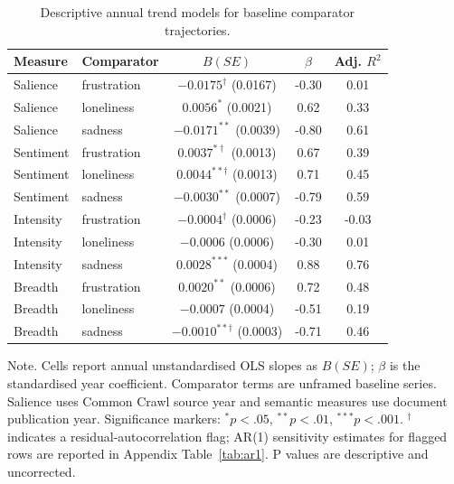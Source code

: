 \begin{table}[t!]
\centering
\caption{Descriptive annual trend models for baseline comparator trajectories.}
\label{tab:comparators}
\small
\begin{tabular}{@{}llccc@{}}
\toprule
Measure & Comparator & $B(SE)$ & $\beta$ & Adj. $R^2$ \\
\midrule
Salience & frustration & $-0.0175^{\dagger}$ (0.0167) & -0.30 & 0.01 \\
Salience & loneliness & $0.0056^{*}$ (0.0021) & 0.62 & 0.33 \\
Salience & sadness & $-0.0171^{**}$ (0.0039) & -0.80 & 0.61 \\
Sentiment & frustration & $0.0037^{*\dagger}$ (0.0013) & 0.67 & 0.39 \\
Sentiment & loneliness & $0.0044^{**\dagger}$ (0.0013) & 0.71 & 0.45 \\
Sentiment & sadness & $-0.0030^{**}$ (0.0007) & -0.79 & 0.59 \\
Intensity & frustration & $-0.0004^{\dagger}$ (0.0006) & -0.23 & -0.03 \\
Intensity & loneliness & $-0.0006$ (0.0006) & -0.30 & 0.01 \\
Intensity & sadness & $0.0028^{***}$ (0.0004) & 0.88 & 0.76 \\
Breadth & frustration & $0.0020^{**}$ (0.0006) & 0.72 & 0.48 \\
Breadth & loneliness & $-0.0007$ (0.0004) & -0.51 & 0.19 \\
Breadth & sadness & $-0.0010^{**\dagger}$ (0.0003) & -0.71 & 0.46 \\
\bottomrule
\end{tabular}
\parbox{\linewidth}{\footnotesize Note. Cells report annual unstandardised OLS slopes as $B(SE)$; $\beta$ is the standardised year coefficient. Comparator terms are unframed baseline series. Salience uses Common Crawl source year and semantic measures use document publication year. Significance markers: $^{*}p<.05$, $^{**}p<.01$, $^{***}p<.001$. $^{\dagger}$ indicates a residual-autocorrelation flag; AR(1) sensitivity estimates for flagged rows are reported in Appendix Table~\ref{tab:ar1}. P values are descriptive and uncorrected.}
\end{table}

